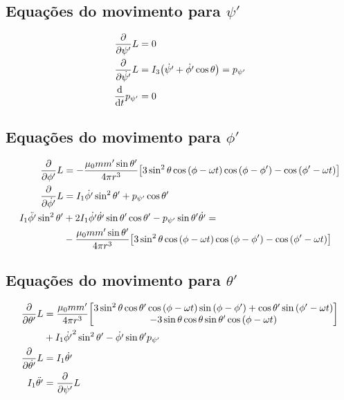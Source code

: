 \documentclass[a4paper, 12pt]{article}
\begin{document}
\subsection{Equações do movimento para $\psi'$}

\begin{align}
    \pdv{}{\psi'}L&=0\nonumber\\
    \pdv{}{\dot{\psi'}}L&=I_3\qty(\dot{\psi'}+\dot{\phi'}\cos\theta)=p_{\psi'}\nonumber\\
    \dv{}{t}p_{\psi'}&=0
\end{align}

\subsection{Equações do movimento para $\phi'$}

\begin{align}
    \pdv{}{\phi'}L&=-\frac{\mu_0mm'\sin\theta'}{4\pi r^3}\qty[3\sin^2\theta\cos\qty(\phi-\omega t)\cos\qty(\phi-\phi')-\cos\qty(\phi'-\omega t)]\nonumber\\
    \pdv{}{\dot{\phi'}}L&=I_1\dot{\phi'}\sin^2\theta'+p_{\psi'}\cos\theta'\nonumber\\
    I_1\ddot{\phi'}\sin^2\theta'&+2I_1\dot{\phi'}\dot{\theta'}\sin\theta'\cos\theta'-p_{\psi'}\sin\theta'\dot{\theta'}=\nonumber\\
    &-\frac{\mu_0mm'\sin\theta'}{4\pi r^3}\qty[3\sin^2\theta\cos\qty(\phi-\omega t)\cos\qty(\phi-\phi')-\cos\qty(\phi'-\omega t)]
\end{align}

\subsection{Equações do movimento para $\theta'$}

\begin{align}
    \pdv{}{\theta'}L&=\frac{\mu_0mm'}{4\pi r^3}\mqty[3\sin^2\theta\cos\theta'\cos\qty(\phi-\omega t)\sin\qty(\phi-\phi')+\cos\theta'\sin\qty(\phi'-\omega t)\\
    -3\sin\theta\cos\theta\sin\theta'\cos\qty(\phi-\omega t)]\nonumber\\
    &+I_1\dot{\phi'}^2\sin^2\theta'-\dot{\phi'}\sin\theta'p_{\psi'}\nonumber\\
    \pdv{}{\dot{\theta'}}L&=I_1\dot{\theta'}\nonumber\\
    I_1\ddot{\theta'}&=\pdv{}{\psi'}L
\end{align}
\end{document}
